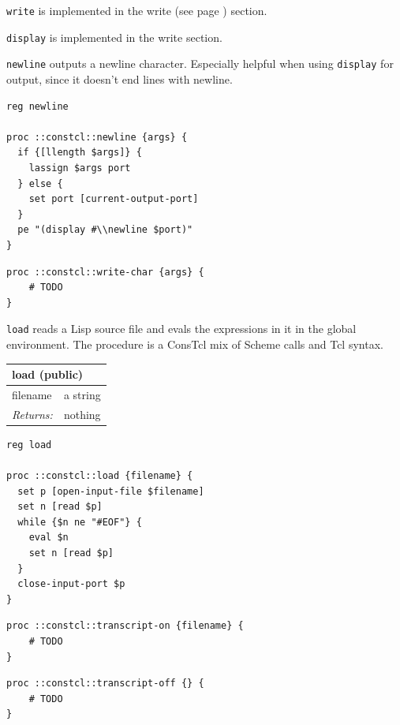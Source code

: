 \documentclass[twoside,9pt]{report}
\begin{document}
\texttt{write} is implemented in the write (see page \pageref{write}) section.


\texttt{display} is implemented in the write section.


\texttt{newline} outputs a newline character. Especially helpful when using \texttt{display} for output, since it doesn't end lines with newline.

\noindent\makebox[\linewidth]{\rule{\linewidth}{0.4pt}}
\begin{lstlisting}
reg newline
 
proc ::constcl::newline {args} {
  if {[llength $args]} {
    lassign $args port
  } else {
    set port [current-output-port]
  }
  pe "(display #\\newline $port)"
}
\end{lstlisting}
\noindent\makebox[\linewidth]{\rule{\linewidth}{0.4pt}}
\noindent\makebox[\linewidth]{\rule{\linewidth}{0.4pt}}
\begin{lstlisting}
proc ::constcl::write-char {args} {
    # TODO
}
\end{lstlisting}
\noindent\makebox[\linewidth]{\rule{\linewidth}{0.4pt}}

\texttt{load} reads a Lisp source file and evals the expressions in it in the global environment. The procedure is a ConsTcl mix of Scheme calls and Tcl syntax.

\begin{tabular}{ |l l| }
\hline
\multicolumn{2}{|l|}{load (public)} \\
\hline
filename & a string \\
\textit{Returns:} & nothing \\
\hline
\end{tabular}

\noindent\makebox[\linewidth]{\rule{\linewidth}{0.4pt}}
\begin{lstlisting}
reg load
 
proc ::constcl::load {filename} {
  set p [open-input-file $filename]
  set n [read $p]
  while {$n ne "#EOF"} {
    eval $n
    set n [read $p]
  }
  close-input-port $p
}
\end{lstlisting}
\noindent\makebox[\linewidth]{\rule{\linewidth}{0.4pt}}
\noindent\makebox[\linewidth]{\rule{\linewidth}{0.4pt}}
\begin{lstlisting}
proc ::constcl::transcript-on {filename} {
    # TODO
}
\end{lstlisting}
\noindent\makebox[\linewidth]{\rule{\linewidth}{0.4pt}}
\noindent\makebox[\linewidth]{\rule{\linewidth}{0.4pt}}
\begin{lstlisting}
proc ::constcl::transcript-off {} {
    # TODO
}
\end{lstlisting}
\noindent\makebox[\linewidth]{\rule{\linewidth}{0.4pt}}
\end{document}
